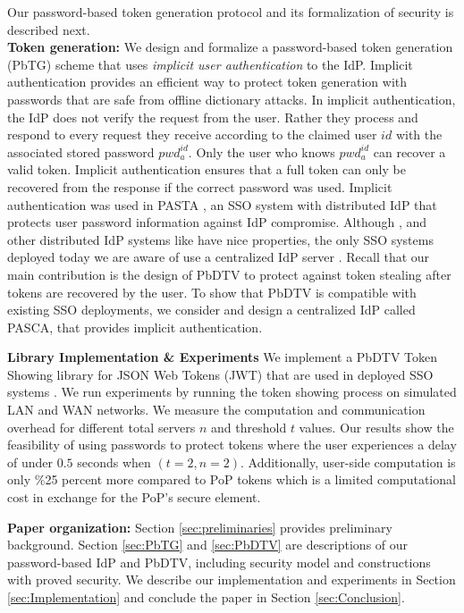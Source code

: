 \documentclass[conference]{IEEEtran}
\begin{document}
Our password-based token generation protocol and its formalization of security is described next.\\

{\bf Token generation:} We design and formalize a password-based token generation (PbTG) scheme that uses {\em implicit user authentication} to the IdP. Implicit authentication provides an efficient way to protect token generation with passwords that are safe from offline dictionary attacks. In implicit authentication, the IdP does not verify the request from the user. Rather they process and respond to every request they receive according to the claimed user $id$ with the associated stored password $pwd^{id}_{a}$. Only the user who knows $pwd^{id}_{a}$ can recover a valid token. Implicit authentication ensures that a full token can only be recovered from the response if the correct password was used.  
Implicit authentication was used in PASTA \cite{PASTA-Agrawal}, an SSO system with distributed IdP that protects user password information against IdP compromise. Although \cite{PASTA-Agrawal}, and other distributed IdP systems like \cite{PESTO-baum,PASTAU-Rawat} have nice properties, the only SSO systems deployed today we are aware of use a centralized IdP server \cite{openIDConnect,SAML}. Recall that our main contribution is the design of PbDTV to protect against token stealing after tokens are recovered by the user. To show that PbDTV is compatible with existing SSO deployments, we consider and design a centralized IdP called PASCA, that provides implicit authentication.  

{\bf Library Implementation \& Experiments} We implement a PbDTV Token Showing library for JSON Web Tokens (JWT) that are used in deployed SSO systems \cite{openIDConnect,SAML}. We run experiments by running the token showing process on simulated LAN and WAN networks. We measure the computation and communication overhead for different total servers $n$ and threshold $t$ values. Our results show the feasibility of using passwords to protect tokens where the user experiences a delay of under $0.5$ seconds when $(t=2,n=2)$. Additionally, user-side computation is only \%25 percent more compared to PoP tokens which is a limited computational cost in exchange for the PoP's secure element. 

\noindent
{\bf Paper organization:} Section \ref{sec:preliminaries} provides preliminary background. Section \ref{sec:PbTG} and \ref{sec:PbDTV} are descriptions of our password-based IdP and PbDTV, including security model and constructions with proved  security.
We describe our implementation and experiments in Section \ref{sec:Implementation} and conclude the paper in Section \ref{sec:Conclusion}.
\end{document}
